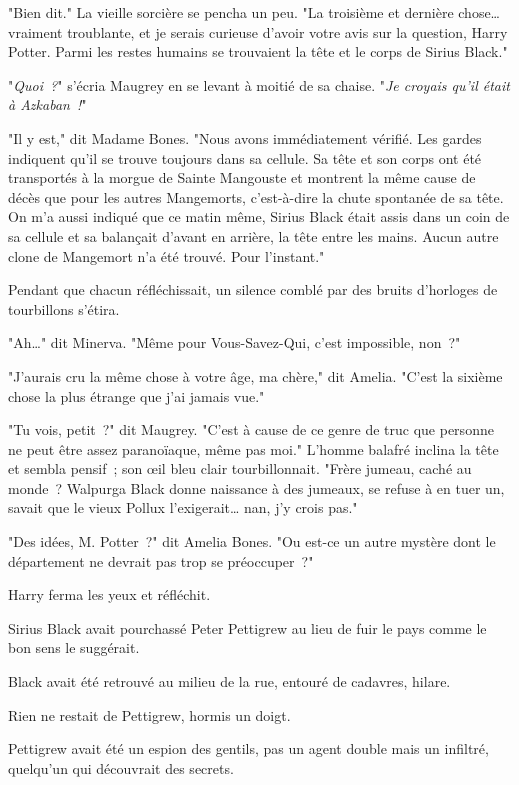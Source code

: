 "Bien dit." La vieille sorcière se pencha un peu. "La troisième et dernière chose… vraiment troublante, et je serais curieuse d'avoir votre avis sur la question, Harry Potter. Parmi les restes humains se trouvaient la tête et le corps de Sirius Black."

"\emph{Quoi~?}" s'écria Maugrey en se levant à moitié de sa chaise. "\emph{Je croyais qu'il était à Azkaban~!}"

"Il y est," dit Madame Bones. "Nous avons immédiatement vérifié. Les gardes indiquent qu'il se trouve toujours dans sa cellule. Sa tête et son corps ont été transportés à la morgue de Sainte Mangouste et montrent la même cause de décès que pour les autres Mangemorts, c'est-à-dire la chute spontanée de sa tête. On m'a aussi indiqué que ce matin même, Sirius Black était assis dans un coin de sa cellule et sa balançait d'avant en arrière, la tête entre les mains. Aucun autre clone de Mangemort n'a été trouvé. Pour l'instant."

Pendant que chacun réfléchissait, un silence comblé par des bruits d'horloges de tourbillons s'étira.

"Ah…" dit Minerva. "Même pour Vous-Savez-Qui, c'est impossible, non~?"

"J'aurais cru la même chose à votre âge, ma chère," dit Amelia. "C'est la sixième chose la plus étrange que j'ai jamais vue."

"Tu vois, petit~?" dit Maugrey. "C'est à cause de ce genre de truc que personne ne peut être assez paranoïaque, même pas moi." L'homme balafré inclina la tête et sembla pensif~; son œil bleu clair tourbillonnait. "Frère jumeau, caché au monde~? Walpurga Black donne naissance à des jumeaux, se refuse à en tuer un, savait que le vieux Pollux l'exigerait… nan, j'y crois pas."

"Des idées, M. Potter~?" dit Amelia Bones. "Ou est-ce un autre mystère dont le département ne devrait pas trop se préoccuper~?"

Harry ferma les yeux et réfléchit.

Sirius Black avait pourchassé Peter Pettigrew au lieu de fuir le pays comme le bon sens le suggérait.

Black avait été retrouvé au milieu de la rue, entouré de cadavres, hilare.

Rien ne restait de Pettigrew, hormis un doigt.

Pettigrew avait été un espion des gentils, pas un agent double mais un infiltré, quelqu'un qui découvrait des secrets.

